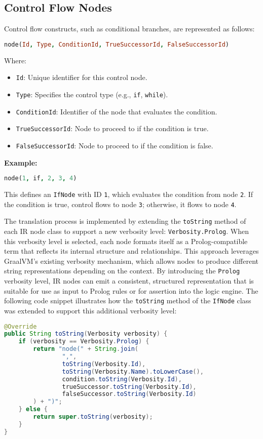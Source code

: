 \subsection*{Control Flow Nodes}

Control flow constructs, such as conditional branches, are represented as follows:

\begin{lstlisting}[language=Prolog]
node(Id, Type, ConditionId, TrueSuccessorId, FalseSuccessorId)
\end{lstlisting}

Where:
\begin{itemize}
  \item \texttt{Id}: Unique identifier for this control node.
  \item \texttt{Type}: Specifies the control type (e.g., \texttt{if}, \texttt{while}).
  \item \texttt{ConditionId}: Identifier of the node that evaluates the condition.
  \item \texttt{TrueSuccessorId}: Node to proceed to if the condition is true.
  \item \texttt{FalseSuccessorId}: Node to proceed to if the condition is false.
\end{itemize}

\textbf{Example:}
\begin{lstlisting}[language=Prolog]
node(1, if, 2, 3, 4)
\end{lstlisting}
This defines an \texttt{IfNode} with ID \texttt{1}, which evaluates the condition from node \texttt{2}. If the condition is true, control flows to node \texttt{3}; otherwise, it flows to node \texttt{4}.

\bigskip

The translation process is implemented by extending the \texttt{toString} method of each IR node class to support a new verbosity level: \texttt{Verbosity.Prolog}. When this verbosity level is selected, each node formats itself as a Prolog-compatible term that reflects its internal structure and relationships. This approach leverages GraalVM's existing verbosity mechanism, which allows nodes to produce different string representations depending on the context.
By introducing the \texttt{Prolog} verbosity level, IR nodes can emit a consistent, structured representation that is suitable for use as input to Prolog rules or for assertion into the logic engine. The following code snippet illustrates how the \texttt{toString} method of the \texttt{IfNode} class was extended to support this additional verbosity level:

\begin{lstlisting}[language=Java]
@Override
public String toString(Verbosity verbosity) {
    if (verbosity == Verbosity.Prolog) {
        return "node(" + String.join(
                ",",
                toString(Verbosity.Id),
                toString(Verbosity.Name).toLowerCase(),
                condition.toString(Verbosity.Id),
                trueSuccessor.toString(Verbosity.Id),
                falseSuccessor.toString(Verbosity.Id)
        ) + ")";
    } else {
        return super.toString(verbosity);
    }
}
\end{lstlisting}
